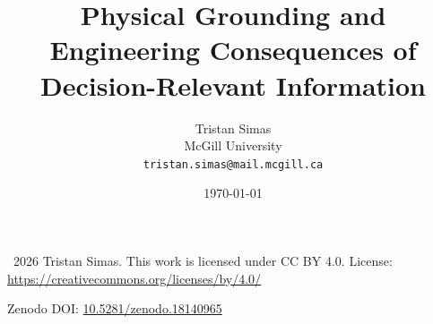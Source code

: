 \documentclass[11pt]{article}
\title{Physical Grounding and Engineering Consequences of Decision-Relevant Information}
\author{
  Tristan Simas\\
  McGill University\\
  \texttt{tristan.simas@mail.mcgill.ca}
}
\date{\today}
\begin{document}
\maketitle

\begingroup
\footnotesize
\noindent\textcopyright\ 2026 Tristan Simas.
This work is licensed under CC BY 4.0.
License: \url{https://creativecommons.org/licenses/by/4.0/}
\par
\noindent Zenodo DOI: \href{https://doi.org/10.5281/zenodo.18140965}{10.5281/zenodo.18140965}
\par
\endgroup

\begin{abstract}

\end{abstract}


















\end{document}
